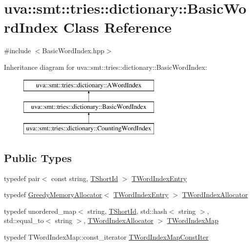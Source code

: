 \hypertarget{classuva_1_1smt_1_1tries_1_1dictionary_1_1_basic_word_index}{}\section{uva\+:\+:smt\+:\+:tries\+:\+:dictionary\+:\+:Basic\+Word\+Index Class Reference}
\label{classuva_1_1smt_1_1tries_1_1dictionary_1_1_basic_word_index}


{\ttfamily \#include $<$Basic\+Word\+Index.\+hpp$>$}

Inheritance diagram for uva\+:\+:smt\+:\+:tries\+:\+:dictionary\+:\+:Basic\+Word\+Index\+:\begin{figure}[H]
\begin{center}
\leavevmode
\includegraphics[height=3.000000cm]{classuva_1_1smt_1_1tries_1_1dictionary_1_1_basic_word_index}
\end{center}
\end{figure}
\subsection*{Public Types}
\begin{DoxyCompactItemize}
\item 
typedef pair$<$ const string, \hyperlink{namespaceuva_1_1smt_1_1hashing_adcf22e1982ad09d3a63494c006267469}{T\+Short\+Id} $>$ \hyperlink{classuva_1_1smt_1_1tries_1_1dictionary_1_1_basic_word_index_af822e72a0e94a0e96e83ee9bf16d50e2}{T\+Word\+Index\+Entry}
\item 
typedef \hyperlink{classuva_1_1smt_1_1tries_1_1alloc_1_1_greedy_memory_allocator}{Greedy\+Memory\+Allocator}$<$ \hyperlink{classuva_1_1smt_1_1tries_1_1dictionary_1_1_basic_word_index_af822e72a0e94a0e96e83ee9bf16d50e2}{T\+Word\+Index\+Entry} $>$ \hyperlink{classuva_1_1smt_1_1tries_1_1dictionary_1_1_basic_word_index_a8905f9a7cdaf1c7295043be33de20749}{T\+Word\+Index\+Allocator}
\item 
typedef unordered\+\_\+map$<$ string, \hyperlink{namespaceuva_1_1smt_1_1hashing_adcf22e1982ad09d3a63494c006267469}{T\+Short\+Id}, std\+::hash$<$ string $>$, std\+::equal\+\_\+to$<$ string $>$, \hyperlink{classuva_1_1smt_1_1tries_1_1dictionary_1_1_basic_word_index_a8905f9a7cdaf1c7295043be33de20749}{T\+Word\+Index\+Allocator} $>$ \hyperlink{classuva_1_1smt_1_1tries_1_1dictionary_1_1_basic_word_index_ab9afbbd6dda7d8579f804508ac094574}{T\+Word\+Index\+Map}
\item 
typedef T\+Word\+Index\+Map\+::const\+\_\+iterator \hyperlink{classuva_1_1smt_1_1tries_1_1dictionary_1_1_basic_word_index_aedf00c11ba1f7ef5565ed7ed523087ec}{T\+Word\+Index\+Map\+Const\+Iter}
\end{DoxyCompactItemize}
